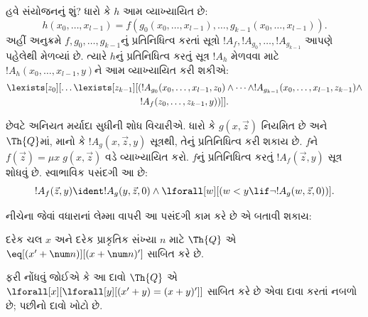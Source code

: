 હવે સંયોજનનું શું? ધારો કે $h$ આમ વ્યાખ્યાયિત છે:
\[
h(x_0,\dots,x_{l-1}) = f(g_0(x_0,\dots,x_{l-1}), \dots,
g_{k-1}(x_0,\dots,x_{l-1})).
\]
અહીં અનુક્રમે $f,g_0,\dots,g_{k-1}$નું પ્રતિનિધિત્વ
કરતાં સૂત્રો $!A_f, !A_{g_0}, \dots,
!A_{g_{k-1}}$ આપણે પહેલેથી મેળવ્યાં છે. ત્યારે
$h$નું પ્રતિનિધિત્વ કરતું સૂત્ર $!A_h$ મેળવવા માટે
$!A_h(x_0,\dots,x_{l-1},y)$ને આમ વ્યાખ્યાયિત કરી શકીએ:
\begin{multline*}
  \lexists[z_0][\dots \lexists[z_{k-1}][(!A_{g_0}(x_0,\dots,x_{l-1},z_0) \land
  \dots \land !A_{g_{k-1}}(x_0,\dots,x_{l-1},z_{k-1}) \land\\
  !A_f(z_0,\dots,z_{k-1},y))]].
\end{multline*}

છેવટે અનિયત મર્યાદા સુધીની શોધ વિચારીએ. ધારો કે
$g(x,\vec z)$ નિયમિત છે અને $\Th{Q}$માં, માનો કે
$!A_g(x,\vec z,y)$ સૂત્રથી, તેનું પ્રતિનિધિત્વ કરી
શકાય છે. $f$ને $f(\vec z) = \mu x \; g(x,\vec z)$
વડે વ્યાખ્યાયિત કરો. $f$નું પ્રતિનિધિત્વ કરતું
$!A_f(\vec z,y)$ સૂત્ર શોધવું છે. સ્વાભાવિક પસંદગી આ છે:
\[
!A_f(\vec z,y) \ident !A_g(y,\vec z,0) \land \lforall[w][(w < y
\lif \lnot !A_g(w,\vec z,0))].
\]

નીચેના જેવાં વધારાનાં લેમ્મા વાપરી આ પસંદગી કામ કરે છે
એ બતાવી શકાય:

\begin{lem}
  દરેક ચલ $x$ અને દરેક પ્રાકૃતિક સંખ્યા $n$ માટે
  $\Th{Q}$ એ $\eq[(x'
  + \num n)][(x + \num n)']$ સાબિત કરે છે.
\end{lem}

ફરી નોંધવું જોઈએ કે આ દાવો $\Th{Q}$ એ
$\lforall[x][\lforall[y][(x' + y) = (x +y)']]$
સાબિત કરે છે એવા દાવા કરતાં નબળો છે; પછીનો દાવો ખોટો છે.

